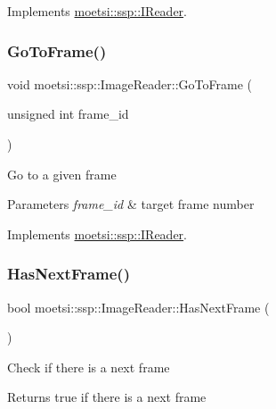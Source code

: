 Implements \hyperlink{classmoetsi_1_1ssp_1_1IReader_a4116c1931fde7bd66133934ffdca1cce}{moetsi\+::ssp\+::\+I\+Reader}.

\mbox{\label{classmoetsi_1_1ssp_1_1ImageReader_a32eb88cc612e6920f4910e0803b0ce3c}} 
\subsubsection{\texorpdfstring{Go\+To\+Frame()}{GoToFrame()}}
{\footnotesize\ttfamily void moetsi\+::ssp\+::\+Image\+Reader\+::\+Go\+To\+Frame (\begin{DoxyParamCaption}\item[{unsigned int}]{frame\+\_\+id }\end{DoxyParamCaption})\hspace{0.3cm}{\ttfamily [virtual]}}

Go to a given frame 
\begin{DoxyParams}{Parameters}
{\em frame\+\_\+id} & target frame number \\
\hline
\end{DoxyParams}


Implements \hyperlink{classmoetsi_1_1ssp_1_1IReader_a6f1be3c06538992cca6d550bd9566681}{moetsi\+::ssp\+::\+I\+Reader}.

\mbox{\label{classmoetsi_1_1ssp_1_1ImageReader_ad8e87720ca0ec97de501f1070119b28d}} 
\subsubsection{\texorpdfstring{Has\+Next\+Frame()}{HasNextFrame()}}
{\footnotesize\ttfamily bool moetsi\+::ssp\+::\+Image\+Reader\+::\+Has\+Next\+Frame (\begin{DoxyParamCaption}{ }\end{DoxyParamCaption})\hspace{0.3cm}{\ttfamily [virtual]}}

Check if there is a next frame \begin{DoxyReturn}{Returns}
true if there is a next frame 
\end{DoxyReturn}


